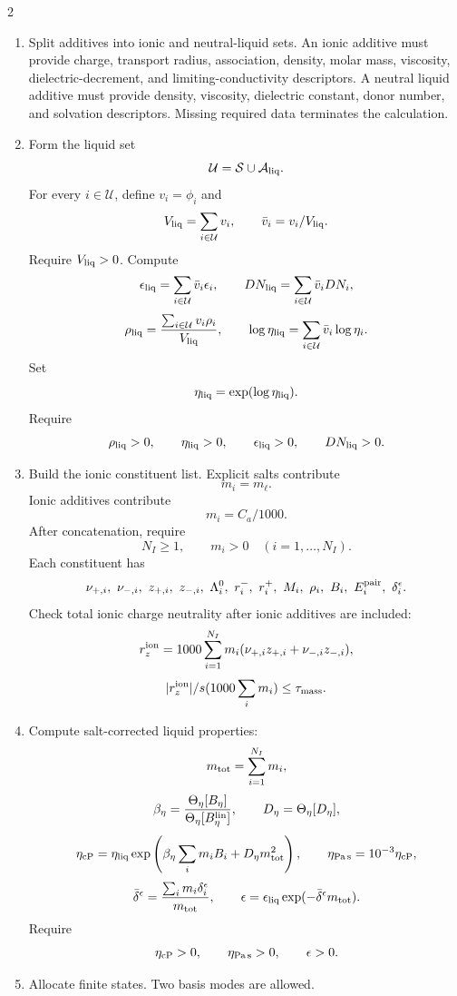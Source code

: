 \documentclass[10pt]{article}
\begin{document}
\begin{multicols}{2}
\begin{enumerate}[label=\textbf{A\arabic*.}]
\item Split additives into ionic and neutral-liquid sets. An ionic additive
must provide charge, transport radius, association, density, molar mass,
viscosity, dielectric-decrement, and limiting-conductivity descriptors. A
neutral liquid additive must provide density, viscosity, dielectric constant,
donor number, and solvation descriptors. Missing required data terminates the
calculation.

\item Form the liquid set
\[
\mathcal U=\mathcal S\cup\mathcal A_{\rm liq}.
\]
For every \(i\in\mathcal U\), define \(v_i=\phi_i\) and
\[
V_{\rm liq}=\sum_{i\in\mathcal U}v_i,
\qquad
\bar v_i=v_i/V_{\rm liq}.
\]
Require \(V_{\rm liq}>0\). Compute
\[
\epsilon_{\rm liq}=\sum_{i\in\mathcal U}\bar v_i\epsilon_i,
\qquad
DN_{\rm liq}=\sum_{i\in\mathcal U}\bar v_iDN_i,
\]
\[
\rho_{\rm liq}
=
\frac{\sum_{i\in\mathcal U}v_i\rho_i}{V_{\rm liq}},
\qquad
\log\eta_{\rm liq}
=
\sum_{i\in\mathcal U}\bar v_i\log\eta_i.
\]
Set
\[
\eta_{\rm liq}=\exp(\log\eta_{\rm liq}).
\]
Require
\[
\rho_{\rm liq}>0,
\qquad
\eta_{\rm liq}>0,
\qquad
\epsilon_{\rm liq}>0,
\qquad
DN_{\rm liq}>0.
\]

\item Build the ionic constituent list. Explicit salts contribute
\[
m_i=m_\ell.
\]
Ionic additives contribute
\[
m_i=C_a/1000.
\]
After concatenation, require
\[
N_I\ge1,
\qquad
m_i>0\quad(i=1,\ldots,N_I).
\]
Each constituent has
\[
\nu_{+,i},\ \nu_{-,i},\ z_{+,i},\ z_{-,i},\
\Lambda_i^0,\ r_i^-,\ r_i^+,\ M_i,\ \rho_i,\ B_i,\
E_i^{\rm pair},\ \delta_i^\epsilon.
\]
Check total ionic charge neutrality after ionic additives are included:
\[
r_z^{\rm ion}
=
1000\sum_{i=1}^{N_I}
m_i(\nu_{+,i}z_{+,i}+\nu_{-,i}z_{-,i}),
\]
\[
|r_z^{\rm ion}|/s(1000\sum_i m_i)\le\tau_{\rm mass}.
\]

\item Compute salt-corrected liquid properties:
\[
m_{\rm tot}=\sum_{i=1}^{N_I}m_i,
\]
\[
\beta_\eta
=
\frac{\Theta_\eta[B_\eta]}{\Theta_\eta[B_\eta^{\rm lin}]},
\qquad
D_\eta=\Theta_\eta[D_\eta],
\]
\[
\eta_{\rm cP}
=
\eta_{\rm liq}
\exp\left(
\beta_\eta\sum_i m_iB_i+D_\eta m_{\rm tot}^2
\right),
\qquad
\eta_{\rm Pa\,s}=10^{-3}\eta_{\rm cP},
\]
\[
\bar\delta^\epsilon
=
\frac{\sum_i m_i\delta_i^\epsilon}{m_{\rm tot}},
\qquad
\epsilon
=
\epsilon_{\rm liq}\exp(-\bar\delta^\epsilon m_{\rm tot}).
\]
Require
\[
\eta_{\rm cP}>0,
\qquad
\eta_{\rm Pa\,s}>0,
\qquad
\epsilon>0.
\]

\item Allocate finite states. Two basis modes are allowed.


\end{enumerate}
\end{multicols}
\end{document}
